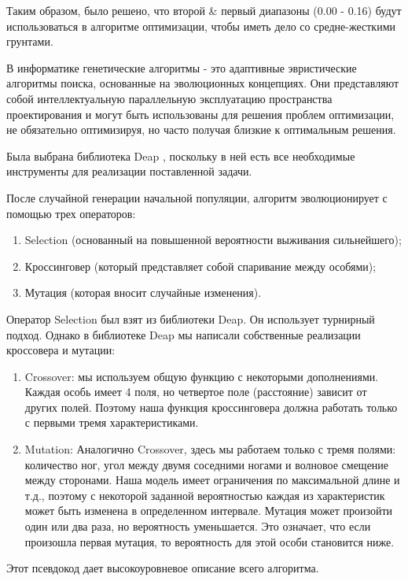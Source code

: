 Таким образом, было решено, что второй \& первый диапазоны (0.00 - 0.16) будут использоваться в алгоритме оптимизации, чтобы иметь дело со средне-жесткими грунтами.

В информатике генетические алгоритмы - это адаптивные эвристические алгоритмы поиска, основанные на эволюционных концепциях. Они представляют собой интеллектуальную параллельную эксплуатацию пространства проектирования и могут быть использованы для решения проблем оптимизации, не обязательно оптимизируя, но часто получая близкие к оптимальным решения. 

Была выбрана библиотека Deap \cite{fortin2012deap}, поскольку в ней есть все необходимые инструменты для реализации поставленной задачи.

После случайной генерации начальной популяции, алгоритм эволюционирует с помощью трех операторов:
\begin{enumerate}
\item Selection (основанный на повышенной вероятности выживания сильнейшего);
\item Кроссинговер (который представляет собой спаривание между особями);
\item Мутация (которая вносит случайные изменения).
\end{enumerate}

Оператор Selection был взят из библиотеки Deap. Он использует турнирный подход.
Однако в библиотеке Deap мы написали собственные реализации кроссовера и мутации:
\begin{enumerate}
\item Crossover: мы используем общую функцию с некоторыми дополнениями. Каждая особь имеет 4 поля, но четвертое поле (расстояние) зависит от других полей. Поэтому наша функция кроссинговера должна работать только с первыми тремя характеристиками.

\item Mutation: Аналогично Crossover, здесь мы работаем только с тремя полями: количество ног, угол между двумя соседними ногами и волновое смещение между сторонами. Наша модель имеет ограничения по максимальной длине и т.д., поэтому с некоторой заданной вероятностью каждая из характеристик может быть изменена в определенном интервале. Мутация может произойти один или два раза, но вероятность уменьшается. Это означает, что если произошла первая мутация, то вероятность для этой особи становится ниже. 
\end{enumerate}

Этот псевдокод дает высокоуровневое описание всего алгоритма.

